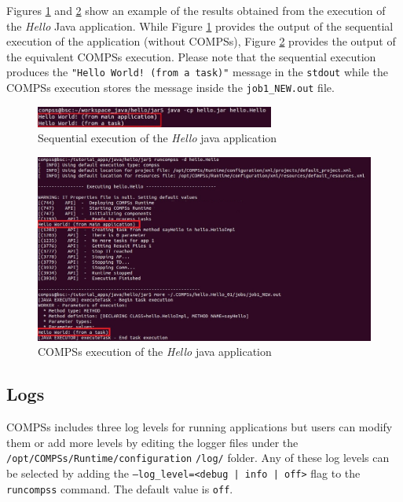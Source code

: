 Figures \ref{fig:hello_seq} and \ref{fig:hello_compss} show an example of the results obtained from the execution of the \textit{Hello} Java 
 application. While Figure \ref{fig:hello_seq} provides the output of the sequential execution of the application (without COMPSs), Figure \ref{fig:hello_compss}
provides the output of the equivalent COMPSs execution. Please note that the sequential execution produces the \texttt{"Hello World! (from a task)"} message
in the \texttt{stdout} while the COMPSs execution stores the message inside the \texttt{job1\_NEW.out} file.
\begin{figure}[!ht]
  \centering
    \includegraphics[width=0.7\textwidth]{./Sections/3_Results_and_Logs/Figures/hello_seq_stdout.jpeg}
    \caption{Sequential execution of the \textit{Hello} java application}
    \label{fig:hello_seq}
\end{figure}

\begin{figure}[!ht]
  \centering
    \includegraphics[width=\textwidth]{./Sections/3_Results_and_Logs/Figures/hello_compss_stdout_and_job.jpeg}
    \caption{COMPSs execution of the \textit{Hello} java application}
    \label{fig:hello_compss}
\end{figure}
\newpage

\subsection{Logs}
COMPSs includes three log levels for running applications but users can modify them or add more levels by editing the
logger files under the \verb|/opt/COMPSs/Runtime/configuration| \verb|/log/| folder. Any of these log levels can be selected by 
adding the \texttt{--log\_level=<debug | info | off>} flag to the \texttt{runcompss} command. The default value is \texttt{off}.


